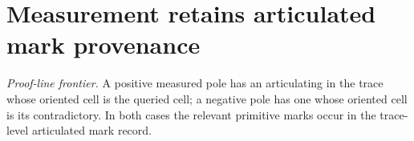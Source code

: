 \section{Measurement retains articulated mark provenance}

\begin{theorem}\label{thm:measured-mark-provenance}\notready{}
\emph{Proof-line frontier.} A positive measured pole has an articulating in the trace whose oriented cell is the queried cell; a negative pole has one whose oriented cell is its contradictory. In both cases the relevant primitive marks occur in the trace-level articulated mark record.
\end{theorem}
